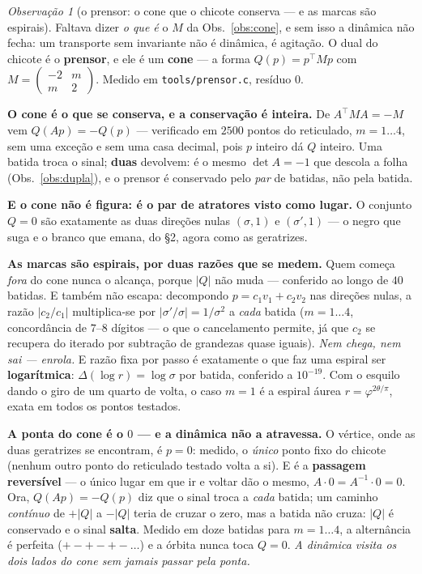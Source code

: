 \documentclass[11pt]{article}
\newcommand{\code}[1]{\texttt{\small #1}}
\theoremstyle{plain}
\theoremstyle{remark}
\newtheorem{obs}{Observação}
\begin{document}
\begin{obs}[o prensor: o cone que o chicote conserva --- e as marcas são espirais]\label{obs:prensor}
Faltava dizer \emph{o que é} o $M$ da Obs.~\ref{obs:cone}, e sem isso a dinâmica não fecha: um
transporte sem invariante não é dinâmica, é agitação. O dual do chicote é o \textbf{prensor}, e ele é
um \textbf{cone} --- a forma $Q(p)=p^{\!\top}Mp$ com
$M=\left(\begin{smallmatrix}-2&m\\m&2\end{smallmatrix}\right)$. Medido em \code{tools/prensor.c},
resíduo $0$.

\textbf{O cone é o que se conserva, e a conservação é inteira.} De $A^{\!\top}MA=-M$ vem
$Q(Ap)=-Q(p)$ --- verificado em $2500$ pontos do reticulado, $m=1\ldots4$, sem uma exceção e sem uma
casa decimal, pois $p$ inteiro dá $Q$ inteiro. Uma batida troca o sinal; \textbf{duas} devolvem: é o
mesmo $\det A=-1$ que descola a folha (Obs.~\ref{obs:dupla}), e o prensor é conservado pelo
\emph{par} de batidas, não pela batida.

\textbf{E o cone não é figura: é o par de atratores visto como lugar.} O conjunto $Q=0$ são
exatamente as duas direções nulas $(\sigma,1)$ e $(\sigma',1)$ --- o negro que suga e o branco que
emana, do §2, agora como as geratrizes.

\textbf{As marcas são espirais, por duas razões que se medem.} Quem começa \emph{fora} do cone nunca
o alcança, porque $|Q|$ não muda --- conferido ao longo de $40$ batidas. E também não escapa:
decompondo $p=c_1v_1+c_2v_2$ nas direções nulas, a razão $|c_2/c_1|$ multiplica-se por
$|\sigma'/\sigma|=1/\sigma^{2}$ a \emph{cada} batida ($m=1\ldots4$, concordância de $7$--$8$ dígitos
--- o que o cancelamento permite, já que $c_2$ se recupera do iterado por subtração de grandezas
quase iguais). \emph{Nem chega, nem sai --- enrola.} E razão fixa por passo é exatamente o que faz
uma espiral ser \textbf{logarítmica}: $\Delta(\log r)=\log\sigma$ por batida, conferido a
$10^{-19}$. Com o esquilo dando o giro de um quarto de volta, o caso $m=1$ é a espiral áurea
$r=\varphi^{2\theta/\pi}$, exata em todos os pontos testados.


\textbf{A ponta do cone é o $0$ --- e a dinâmica não a atravessa.} O vértice, onde as duas
geratrizes se encontram, é $p=0$: medido, o \emph{único} ponto fixo do chicote (nenhum outro ponto do
reticulado testado volta a si). E é a \textbf{passagem reversível} --- o único lugar em que ir e
voltar dão o mesmo, $A\cdot0=A^{-1}\cdot0=0$. Ora, $Q(Ap)=-Q(p)$ diz que o sinal troca a \emph{cada}
batida; um caminho \emph{contínuo} de $+|Q|$ a $-|Q|$ teria de cruzar o zero, mas a batida não cruza:
$|Q|$ é conservado e o sinal \textbf{salta}. Medido em doze batidas para $m=1\ldots4$, a alternância
é perfeita ($+-+-+-\ldots$) e a órbita nunca toca $Q=0$. \emph{A dinâmica visita os dois lados do
cone sem jamais passar pela ponta.}


\end{obs}
\end{document}
